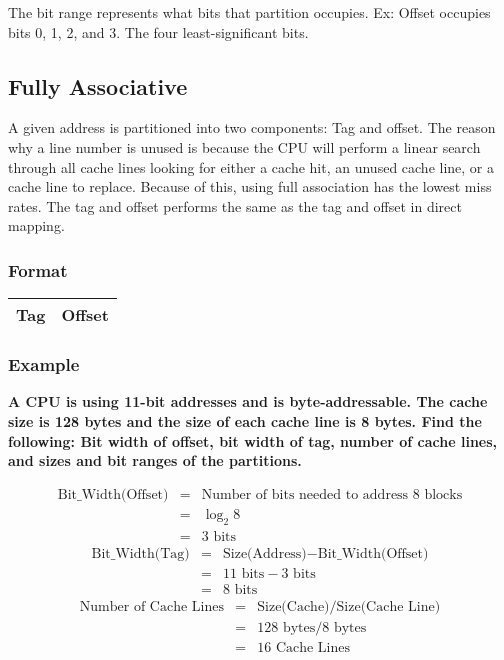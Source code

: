 \documentclass[11pt]{article}
\begin{document}
\noindent The bit range represents what bits that partition occupies. Ex: Offset occupies bits 0, 1, 2, and 3. The four least-significant bits.

\subsection{Fully Associative}

A given address is partitioned into two components: Tag and offset. The reason why a line number is unused is because the CPU will perform a linear search through all cache lines looking for either a cache hit, an unused cache line, or a cache line to replace. Because of this, using full association has the lowest miss rates. The tag and offset performs the same as the tag and offset in direct mapping.


\subsubsection{Format}

\begin{table}[H]
	\centering
	\begin{tabular}{| c | c |}
		\hline
		Tag			&		 Offset\\
		\hline
	\end{tabular}
\end{table}

\subsubsection{Example}

\textbf{A CPU is using 11-bit addresses and is byte-addressable. The cache size is 128 bytes and the size of each cache line is 8 bytes. Find the following: Bit width of offset, bit width of tag, number of cache lines, and sizes and bit ranges of the partitions.}

\begin{eqnarray*}
	\text{Bit\_Width(Offset)} &=& \text{Number of bits needed to address 8 blocks}\\
	&=& \log_2 8\\
	&=& 3 \text{ bits}
\end{eqnarray*}
\begin{eqnarray*}
	\text{Bit\_Width(Tag)} &=& \text{Size(Address)} - \text{Bit\_Width(Offset)}\\
	&=& 11 \text{ bits} - 3 \text{ bits}\\
	&=& 8 \text{ bits}
\end{eqnarray*}
\begin{eqnarray*}
	\text{Number of Cache Lines} &=& \text{Size(Cache)} / \text{Size(Cache Line)}\\
	&=& 128 \text{ bytes} / 8 \text{ bytes}\\
	&=& 16 \text{ Cache Lines}
\end{eqnarray*}
\end{document}
